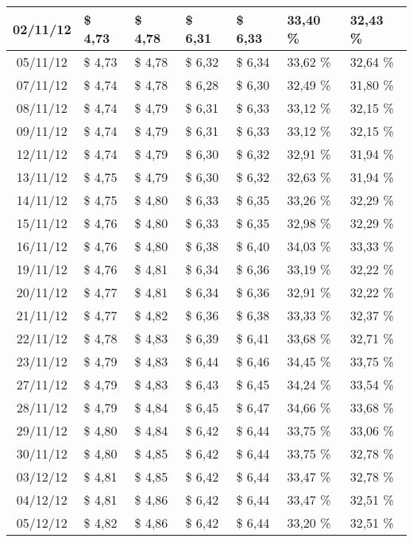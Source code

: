 \begin{center}
\begin{longtable}{|c|p{1.5cm}|p{1.5cm}|p{1.5cm}|p{1.5cm}|p{1.5cm}|p{1.5cm}|}
02/11/12 & \$ 4,73 & \$ 4,78 & \$ 6,31 & \$ 6,33 & 33,40 \% & 32,43 \% \\ \hline
05/11/12 & \$ 4,73 & \$ 4,78 & \$ 6,32 & \$ 6,34 & 33,62 \% & 32,64 \% \\ \hline
07/11/12 & \$ 4,74 & \$ 4,78 & \$ 6,28 & \$ 6,30 & 32,49 \% & 31,80 \% \\ \hline
08/11/12 & \$ 4,74 & \$ 4,79 & \$ 6,31 & \$ 6,33 & 33,12 \% & 32,15 \% \\ \hline
09/11/12 & \$ 4,74 & \$ 4,79 & \$ 6,31 & \$ 6,33 & 33,12 \% & 32,15 \% \\ \hline
12/11/12 & \$ 4,74 & \$ 4,79 & \$ 6,30 & \$ 6,32 & 32,91 \% & 31,94 \% \\ \hline
13/11/12 & \$ 4,75 & \$ 4,79 & \$ 6,30 & \$ 6,32 & 32,63 \% & 31,94 \% \\ \hline
14/11/12 & \$ 4,75 & \$ 4,80 & \$ 6,33 & \$ 6,35 & 33,26 \% & 32,29 \% \\ \hline
15/11/12 & \$ 4,76 & \$ 4,80 & \$ 6,33 & \$ 6,35 & 32,98 \% & 32,29 \% \\ \hline
16/11/12 & \$ 4,76 & \$ 4,80 & \$ 6,38 & \$ 6,40 & 34,03 \% & 33,33 \% \\ \hline
19/11/12 & \$ 4,76 & \$ 4,81 & \$ 6,34 & \$ 6,36 & 33,19 \% & 32,22 \% \\ \hline
20/11/12 & \$ 4,77 & \$ 4,81 & \$ 6,34 & \$ 6,36 & 32,91 \% & 32,22 \% \\ \hline
21/11/12 & \$ 4,77 & \$ 4,82 & \$ 6,36 & \$ 6,38 & 33,33 \% & 32,37 \% \\ \hline
22/11/12 & \$ 4,78 & \$ 4,83 & \$ 6,39 & \$ 6,41 & 33,68 \% & 32,71 \% \\ \hline
23/11/12 & \$ 4,79 & \$ 4,83 & \$ 6,44 & \$ 6,46 & 34,45 \% & 33,75 \% \\ \hline
27/11/12 & \$ 4,79 & \$ 4,83 & \$ 6,43 & \$ 6,45 & 34,24 \% & 33,54 \% \\ \hline
28/11/12 & \$ 4,79 & \$ 4,84 & \$ 6,45 & \$ 6,47 & 34,66 \% & 33,68 \% \\ \hline
29/11/12 & \$ 4,80 & \$ 4,84 & \$ 6,42 & \$ 6,44 & 33,75 \% & 33,06 \% \\ \hline
30/11/12 & \$ 4,80 & \$ 4,85 & \$ 6,42 & \$ 6,44 & 33,75 \% & 32,78 \% \\ \hline
03/12/12 & \$ 4,81 & \$ 4,85 & \$ 6,42 & \$ 6,44 & 33,47 \% & 32,78 \% \\ \hline
04/12/12 & \$ 4,81 & \$ 4,86 & \$ 6,42 & \$ 6,44 & 33,47 \% & 32,51 \% \\ \hline
05/12/12 & \$ 4,82 & \$ 4,86 & \$ 6,42 & \$ 6,44 & 33,20 \% & 32,51 \% \\ \hline

\end{longtable}
\end{center}
